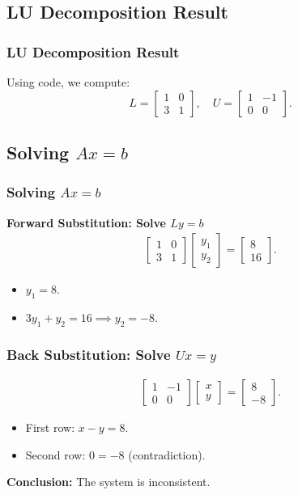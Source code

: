 \documentclass{beamer}
\numberwithin{equation}{section}
\begin{document}
\subsection{LU Decomposition Result}
\begin{frame}
\frametitle{LU Decomposition Result}
Using code, we compute:
\[
L = \begin{bmatrix} 1 & 0 \\ 3 & 1 \end{bmatrix}, \quad
U = \begin{bmatrix} 1 & -1 \\ 0 & 0 \end{bmatrix}.
\]
\end{frame}

\subsection{Solving $A x = b$}
\begin{frame}
\frametitle{Solving $A x = b$}
\textbf{Forward Substitution: Solve $L y = b$}
\begin{align*}
    \begin{bmatrix} 1 & 0 \\ 3 & 1 \end{bmatrix} \begin{bmatrix} y_1 \\ y_2 \end{bmatrix} = \begin{bmatrix} 8 \\ 16 \end{bmatrix}.
\end{align*}
\begin{itemize}
    \item $y_1 = 8$.
    \item $3y_1 + y_2 = 16 \implies y_2 = -8$.
\end{itemize}
\end{frame}

\begin{frame}
\frametitle{Back Substitution: Solve $U x = y$}
\begin{align*}
    \begin{bmatrix} 1 & -1 \\ 0 & 0 \end{bmatrix} \begin{bmatrix} x \\ y \end{bmatrix} = \begin{bmatrix} 8 \\ -8 \end{bmatrix}.
\end{align*}
\begin{itemize}
    \item First row: $x - y = 8$.
    \item Second row: $0 = -8$ (contradiction).
\end{itemize}
\textbf{Conclusion:} The system is inconsistent.
\end{frame}
\end{document}
